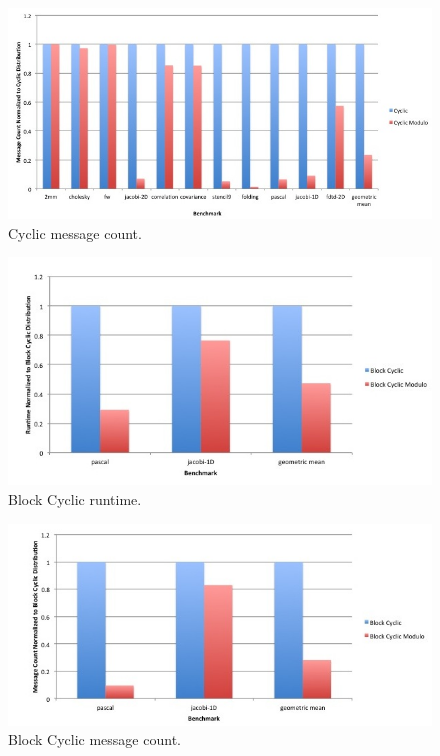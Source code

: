 \begin{figure}
\begin{center}
\includegraphics[scale=0.30]{./Figures/cyclic_message_count}
\caption{Cyclic message count.}
\label{cyclic_message_count}
\end{center}
\end{figure}

\begin{figure}
\begin{center}
\includegraphics[scale=0.30]{./Figures/block_cyclic_runtime}
\caption{Block Cyclic runtime.}
\label{block_cyclic_runtime}
\end{center}
\end{figure}

\begin{figure}
\begin{center}
\includegraphics[scale=0.30]{./Figures/block_cyclic_message_count}
\caption{Block Cyclic message count.}
\label{block_cyclic_message_count}
\end{center}
\end{figure}


